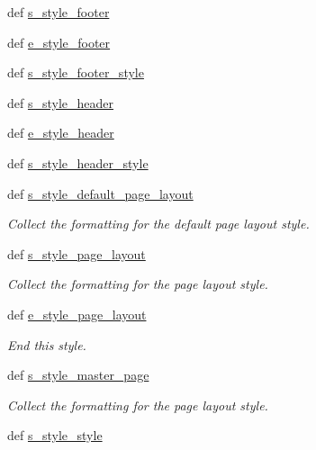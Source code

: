 \begin{DoxyCompactItemize}
def \hyperlink{classodf_1_1odf2xhtml_1_1ODF2XHTML_aa2eca5913f7c3d8be5a4adc50f5644ec}{s\+\_\+style\+\_\+footer}
\item 
def \hyperlink{classodf_1_1odf2xhtml_1_1ODF2XHTML_a6375b542e3e95fc2942d3d879d41a215}{e\+\_\+style\+\_\+footer}
\item 
def \hyperlink{classodf_1_1odf2xhtml_1_1ODF2XHTML_a2e3d1b77b311f2cb75ada19e2ecfaf85}{s\+\_\+style\+\_\+footer\+\_\+style}
\item 
def \hyperlink{classodf_1_1odf2xhtml_1_1ODF2XHTML_abd32bff3904f69c2e065c6184e66c558}{s\+\_\+style\+\_\+header}
\item 
def \hyperlink{classodf_1_1odf2xhtml_1_1ODF2XHTML_a8417c235f667d915381905089debb1d1}{e\+\_\+style\+\_\+header}
\item 
def \hyperlink{classodf_1_1odf2xhtml_1_1ODF2XHTML_a30bd9cb7516fe224132e332c941cdf79}{s\+\_\+style\+\_\+header\+\_\+style}
\item 
def \hyperlink{classodf_1_1odf2xhtml_1_1ODF2XHTML_a884250f7ecd5965dfd442dcc7cab4c04}{s\+\_\+style\+\_\+default\+\_\+page\+\_\+layout}
\begin{DoxyCompactList}\small\item\em Collect the formatting for the default page layout style. \end{DoxyCompactList}\item 
def \hyperlink{classodf_1_1odf2xhtml_1_1ODF2XHTML_abfce093d8d52eb934920ac81406e6245}{s\+\_\+style\+\_\+page\+\_\+layout}
\begin{DoxyCompactList}\small\item\em Collect the formatting for the page layout style. \end{DoxyCompactList}\item 
def \hyperlink{classodf_1_1odf2xhtml_1_1ODF2XHTML_abee7006ba5a3ac42f272b2fe6a6bac44}{e\+\_\+style\+\_\+page\+\_\+layout}
\begin{DoxyCompactList}\small\item\em End this style. \end{DoxyCompactList}\item 
def \hyperlink{classodf_1_1odf2xhtml_1_1ODF2XHTML_a5e9c020ac3487937a5f59777cac8b096}{s\+\_\+style\+\_\+master\+\_\+page}
\begin{DoxyCompactList}\small\item\em Collect the formatting for the page layout style. \end{DoxyCompactList}\item 
def \hyperlink{classodf_1_1odf2xhtml_1_1ODF2XHTML_ac7e3278561ca691900a4efe6ded8269b}{s\+\_\+style\+\_\+style}

\end{DoxyCompactItemize}

